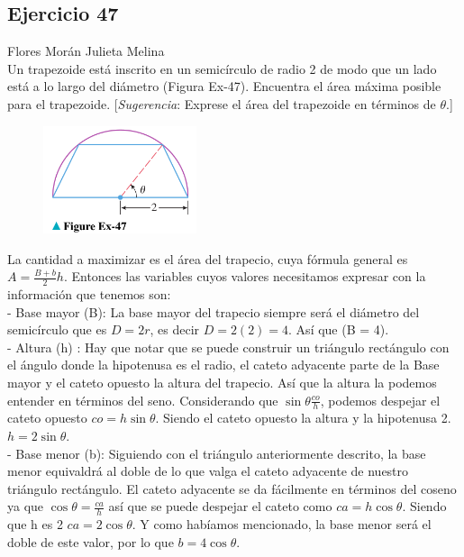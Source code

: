 \documentclass[12pt]{article}
\begin{document}
\subsection{Ejercicio 47} Flores Morán Julieta Melina \\

Un trapezoide está inscrito en un semicírculo de radio 2 de modo que un lado está a lo largo del diámetro (Figura Ex-47). Encuentra el área máxima posible para el trapezoide. [\textit{Sugerencia}: Exprese el área del trapezoide en términos de $\theta$.]\\
\begin{figure}[H]
\centering
\includegraphics[width=0.4\textwidth]{../img/img_Lista3/3_47.png}
\end{figure}
La cantidad a maximizar es el área del trapecio, cuya fórmula general es $A= \frac{B+b}{2}h$. Entonces las variables cuyos valores necesitamos expresar con la información que tenemos son:\\
- Base mayor (B): La base mayor del trapecio siempre será el diámetro del semicírculo que es $D=2r$, es decir $D=2(2) = 4$. Así  que (B = 4).\\
- Altura (h) : Hay que notar que se puede construir un triángulo rectángulo con el ángulo donde la hipotenusa es el radio, el cateto adyacente parte de la Base mayor y el cateto opuesto la altura del trapecio. Así que la altura la podemos entender en términos del seno. Considerando que $\sin{\theta}\frac{co}{h}$, podemos despejar el cateto opuesto $co = h\sin{\theta}$. Siendo el cateto opuesto la altura y la hipotenusa 2. $h = 2\sin{\theta}$.\\
- Base menor (b): Siguiendo con el triángulo anteriormente descrito, la base menor equivaldrá al doble de lo que valga el cateto adyacente de nuestro triángulo rectángulo. El cateto adyacente se da fácilmente en términos del coseno ya que $\cos{\theta} = \frac{ca}{h}$ así que se puede despejar el cateto como $ca = h\cos{\theta}$. Siendo que h es 2 $ca = 2\cos{\theta}$. Y como habíamos mencionado, la base menor será el doble de este valor, por lo que $b = 4\cos{\theta}$.\\
\end{document}
